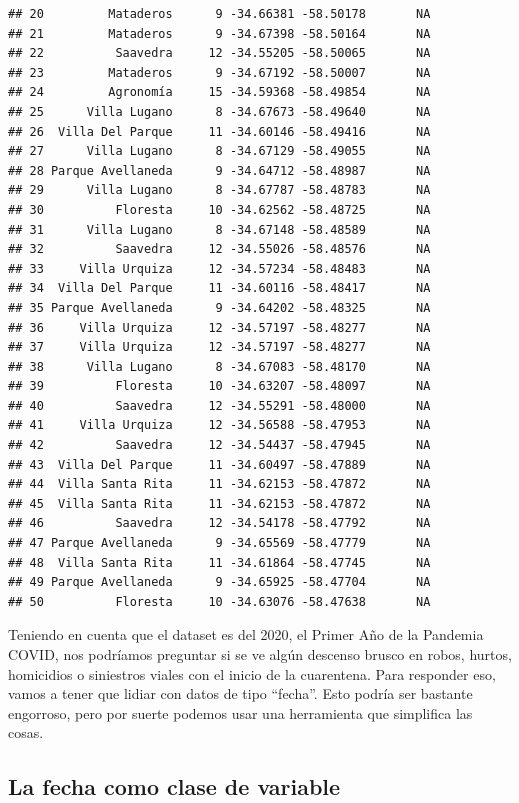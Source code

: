 \documentclass[
]{book}
\begin{document}
\begin{verbatim}
## 20         Mataderos      9 -34.66381 -58.50178       NA
## 21         Mataderos      9 -34.67398 -58.50164       NA
## 22          Saavedra     12 -34.55205 -58.50065       NA
## 23         Mataderos      9 -34.67192 -58.50007       NA
## 24         Agronomía     15 -34.59368 -58.49854       NA
## 25      Villa Lugano      8 -34.67673 -58.49640       NA
## 26  Villa Del Parque     11 -34.60146 -58.49416       NA
## 27      Villa Lugano      8 -34.67129 -58.49055       NA
## 28 Parque Avellaneda      9 -34.64712 -58.48987       NA
## 29      Villa Lugano      8 -34.67787 -58.48783       NA
## 30          Floresta     10 -34.62562 -58.48725       NA
## 31      Villa Lugano      8 -34.67148 -58.48589       NA
## 32          Saavedra     12 -34.55026 -58.48576       NA
## 33     Villa Urquiza     12 -34.57234 -58.48483       NA
## 34  Villa Del Parque     11 -34.60116 -58.48417       NA
## 35 Parque Avellaneda      9 -34.64202 -58.48325       NA
## 36     Villa Urquiza     12 -34.57197 -58.48277       NA
## 37     Villa Urquiza     12 -34.57197 -58.48277       NA
## 38      Villa Lugano      8 -34.67083 -58.48170       NA
## 39          Floresta     10 -34.63207 -58.48097       NA
## 40          Saavedra     12 -34.55291 -58.48000       NA
## 41     Villa Urquiza     12 -34.56588 -58.47953       NA
## 42          Saavedra     12 -34.54437 -58.47945       NA
## 43  Villa Del Parque     11 -34.60497 -58.47889       NA
## 44  Villa Santa Rita     11 -34.62153 -58.47872       NA
## 45  Villa Santa Rita     11 -34.62153 -58.47872       NA
## 46          Saavedra     12 -34.54178 -58.47792       NA
## 47 Parque Avellaneda      9 -34.65569 -58.47779       NA
## 48  Villa Santa Rita     11 -34.61864 -58.47745       NA
## 49 Parque Avellaneda      9 -34.65925 -58.47704       NA
## 50          Floresta     10 -34.63076 -58.47638       NA
\end{verbatim}

Teniendo en cuenta que el dataset es del 2020, el Primer Año de la Pandemia COVID, nos podríamos preguntar si se ve algún descenso brusco en robos, hurtos, homicidios o siniestros viales con el inicio de la cuarentena. Para responder eso, vamos a tener que lidiar con datos de tipo ``fecha''. Esto podría ser bastante engorroso, pero por suerte podemos usar una herramienta que simplifica las cosas.

\hypertarget{la-fecha-como-clase-de-variable}{%
\subsection{La fecha como clase de variable}\label{la-fecha-como-clase-de-variable}}
\end{document}
